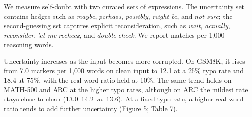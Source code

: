 \documentclass[11pt]{article}
\begin{document}
\begin{table}[t]
\centering
\small
{}
\caption{GSM8K answered-only accuracy (\%) under each mitigation, per condition, with the change against the unmodified prompt (\emph{no fix}). The mean row is taken over the nine typo conditions. $\Delta$ is computed from unrounded accuracies, so it can differ by 0.1 from the difference of the values shown.}
\label{tab:3}
\end{table}
We measure self-doubt with two curated sets of expressions. The uncertainty set contains hedges such as \emph{maybe}, \emph{perhaps}, \emph{possibly}, \emph{might be}, and \emph{not sure}; the second-guessing set captures explicit reconsideration, such as \emph{wait}, \emph{actually}, \emph{reconsider}, \emph{let me recheck}, and \emph{double-check}. We report matches per 1,000 reasoning words.

Uncertainty increases as the input becomes more corrupted. On GSM8K, it rises from 7.0 markers per 1,000 words on clean input to 12.1 at a 25\% typo rate and 18.4 at 75\%, with the real-word ratio held at 10\%. The same trend holds on MATH-500 and ARC at the higher typo rates, although on ARC the mildest rate stays close to clean (13.0--14.2 vs. 13.6). At a fixed typo rate, a higher real-word ratio tends to add further uncertainty (Figure 5; Table 7).
\end{document}
